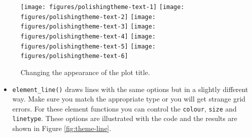 \begin{Shaded}
\begin{Highlighting}[]
\StringTok{ }\StringTok{ }\NormalTok{(} \NormalTok{)}
\StringTok{ }\NormalTok{(} \NormalTok{(} \NormalTok{))}
\StringTok{ }\NormalTok{(} 
              \NormalTok{(} \NormalTok{, } \NormalTok{))}
\StringTok{ }\NormalTok{(} 
              \NormalTok{(} \NormalTok{, } \NormalTok{))}
\StringTok{ }\NormalTok{(} 
              \NormalTok{(} \NormalTok{, } \NormalTok{))}
\StringTok{ }\NormalTok{(} 
              \NormalTok{(} \NormalTok{, } \NormalTok{))}
\end{Highlighting}
\end{Shaded}

\begin{figure}

{\centering \texttt{[image: figures/polishingtheme-text-1]} \texttt{[image: figures/polishingtheme-text-2]} \texttt{[image: figures/polishingtheme-text-3]} \texttt{[image: figures/polishingtheme-text-4]} \texttt{[image: figures/polishingtheme-text-5]} \texttt{[image: figures/polishingtheme-text-6]} 

}

\caption{Changing the appearance of the plot title.\label{fig:theme-text}}
\end{figure}

\begin{itemize}
\itemsep1pt\parskip0pt
\item
  \texttt{element\_line()} draws lines with the same options but in a
  slightly different way. Make sure you match the appropriate type or
  you will get strange grid errors. For these element functions you can
  control the \texttt{colour}, \texttt{size} and \texttt{linetype}.
  These options are illustrated with the code and the results are shown
  in Figure \ref{fig:theme-line}. 
\end{itemize}

